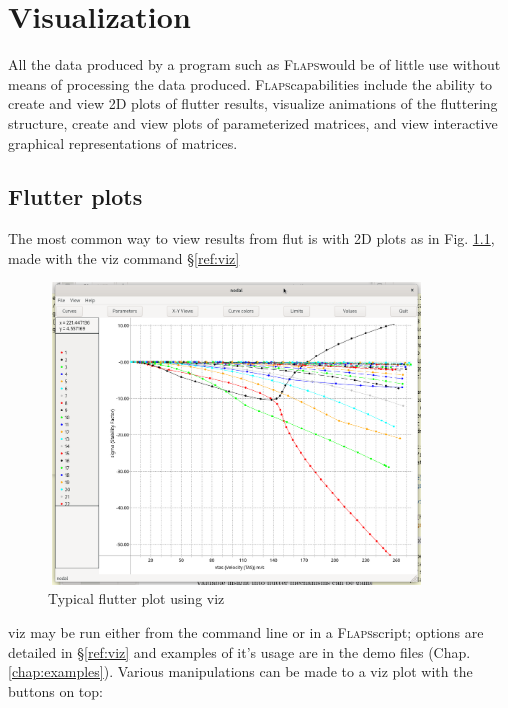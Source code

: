 \documentclass[11pt,openany,twoside]{book}
\numberwithin{equation}{section}		%
\newcommand{\Cmd}[1]{{\sf #1}}
\newcommand{\Flaps}{\textsc{Flaps\:}}
\newcommand{\Sectref}[1]{\S\ref{#1}}
\newcommand{\Chapref}[1]{Chap. \ref{#1}}
\newcommand{\Figref}[1]{Fig. \ref{#1}}  %
\begin{document}
\chapter{Visualization}\label{chap:visualization}

All the data produced by a program such as \Flaps would be of little
use without means of processing the data produced. \Flaps capabilities
include the ability to create and view 2D plots of flutter results,
visualize animations of the fluttering structure, create and view plots
of parameterized matrices, and view interactive graphical representations
of matrices.

\section{Flutter plots}\label{sect:flutter-plots}
The most common way to view results from \Cmd{flut} is with 2D
plots as in \Figref{fig:viz}, made with the \Cmd{viz} command \Sectref{ref:viz}
\begin{figure}[h]
		\includegraphics[height=8cm,width=10cm]{viz.png}
	\centering
	\caption{Typical flutter plot using \Cmd{viz}}\label{fig:viz}
\end{figure}
\Cmd{viz} may be run either from the command line or in a \Flaps script;
options are detailed in \Sectref{ref:viz} and
examples of it's usage are in the demo files (\Chapref{chap:examples}).
Various manipulations can be made to a \Cmd{viz} plot with the buttons on top:
\end{document}

